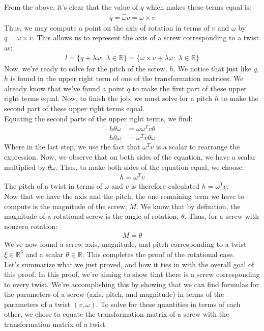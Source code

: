 \documentclass[oneside]{book}
\begin{document}
From the above, it's clear that the value of $q$ which makes these terms equal is:
\begin{align}
    q = \hat\omega v = \omega \times v
\end{align}
Thus, we may compute a point on the axis of rotation in terms of $v$ and $\omega$ by $q = \omega \times v$. This allows us to represent the axis of a screw corresponding to a twist as:
\begin{align}
    l = \{q + \lambda \omega:\; \lambda \in \mathbb{R}\}
    = \{\omega \times v + \lambda \omega:\; \lambda \in \mathbb{R}\}
\end{align}
Now, we're ready to solve for the pitch of the screw, $h$. We notice that just like $q$, $h$ is found in the upper right term of one of the transformation matrices. We already know that we've found a point $q$ to make the first part of these upper right terms equal. Now, to finish the job, we must solve for a pitch $h$ to make the second part of these upper right terms equal.\\
Equating the second parts of the upper right terms, we find:
\begin{align}
    h\theta\omega &= \omega\omega^Tv\theta\\
    h\theta\omega &= \omega^Tv\theta \omega
\end{align}
Where in the last step, we use the fact that $\omega^T v$ is a scalar to rearrange the expression. Now, we observe that on both sides of the equation, we have a scalar multiplied by $\theta\omega$. Thus, to make both sides of the equation equal, we choose:
\begin{align}
    h = \omega^Tv
\end{align}
The pitch of a twist in terms of $\omega$ and $v$ is therefore calculated $h = \omega^T v$.\\
Now that we have the axis and the pitch, the one remaining term we have to compute is the magnitude of the screw, $M$. We know that by definition, the magnitude of a rotational screw is the angle of rotation, $\theta$. Thus, for a screw with nonzero rotation:
\begin{align}
    M = \theta
\end{align}
We've now found a screw axis, magnitude, and pitch corresponding to a twist $\xi \in \mathbb{R}^6$ and a scalar $\theta \in \mathbb{R}$. This completes the proof of the rotational case.\\
Let's summarize what we just proved, and how it ties in with the overall goal of this proof. In this proof, we're aiming to show that there is a screw corresponding to every twist. We're accomplishing this by showing that we can find formulas for the parameters of a screw (axis, pitch, and magnitude) in terms of the parameters of a twist $(v, \omega)$. To solve for these quantities in terms of each other, we chose to equate the transformation matrix of a screw with the transformation matrix of a twist.\\
\end{document}
